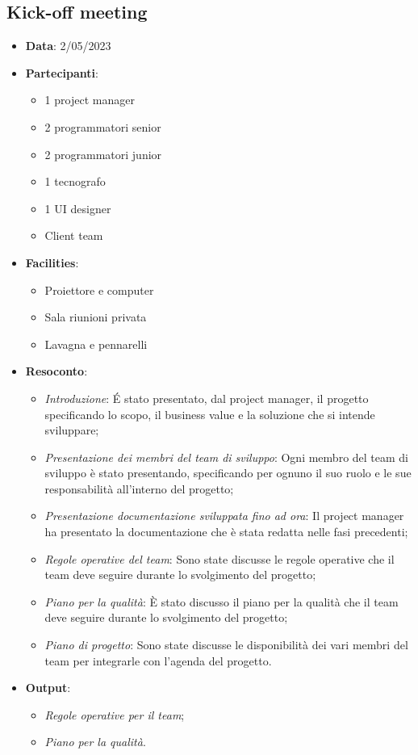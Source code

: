 \documentclass{article}
\begin{document}
  \subsection{Kick-off meeting}
  \begin{itemize}
    \item \textbf{Data}: 2/05/2023
    \item \textbf{Partecipanti}: 
    \begin{itemize}
      \item 1 project manager
      \item 2 programmatori senior
      \item 2 programmatori junior
      \item 1 tecnografo
      \item 1 UI designer
      \item Client team
    \end{itemize}
    \item \textbf{Facilities}:
    \begin{itemize}
      \item Proiettore e computer
      \item Sala riunioni privata
      \item Lavagna e pennarelli
    \end{itemize}
    \item \textbf{Resoconto}:
    \begin{itemize}
      \item \emph{Introduzione}:
        É stato presentato, dal project manager, il progetto specificando lo scopo, il business
          value e la soluzione che si intende sviluppare;
      \item \emph{Presentazione dei membri del team di sviluppo}: 
       Ogni membro del team di sviluppo è stato presentando, specificando per ognuno il suo ruolo
        e le sue responsabilità all'interno del progetto;
      \item \emph{Presentazione documentazione sviluppata fino ad ora}:
        Il project manager ha presentato la documentazione che è stata redatta nelle fasi precedenti;
      \item \emph{Regole operative del team}:
        Sono state discusse le regole operative che il team deve seguire durante lo svolgimento del progetto;
      \item \emph{Piano per la qualità}:
        È stato discusso il piano per la qualità che il team deve seguire durante lo svolgimento del progetto;
      \item \emph{Piano di progetto}:
        Sono state discusse le disponibilità dei vari membri del team per integrarle con l'agenda del progetto.
    \end{itemize}
    \item \textbf{Output}:
    \begin{itemize}
      \item \emph{Regole operative per il team};
      \item \emph{Piano per la qualità}.
    \end{itemize}
  \end{itemize}
\end{document}
